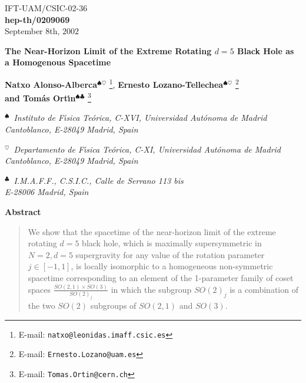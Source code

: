 \documentclass[12pt,a4paper]{article}
\begin{document}
\begin{flushright}
\small
IFT-UAM/CSIC-02-36\\
{\bf hep-th/0209069}\\
September $8$th, $2002$
\normalsize
\end{flushright}

\begin{center}


\vspace{2cm}

{\Large {\bf The Near-Horizon Limit of the Extreme Rotating $d=5$
    Black Hole as a Homogenous Spacetime}}

\vspace{2cm}

{\bf\large Natxo Alonso-Alberca}${}^{\spadesuit\heartsuit}$
\footnote{E-mail: {\tt natxo@leonidas.imaff.csic.es}},
{\bf\large Ernesto Lozano-Tellechea}${}^{\spadesuit\heartsuit}$
\footnote{E-mail: {\tt Ernesto.Lozano@uam.es}}\\
{\bf\large and Tom{\'a}s Ort\'{\i}n}${}^{\spadesuit\clubsuit}$
\footnote{E-mail: {\tt Tomas.Ortin@cern.ch}}

\vspace{1cm}

${}^{\spadesuit}$\ {\it Instituto de F\'{\i}sica Te{\'o}rica, C-XVI,
Universidad Aut{\'o}noma de Madrid\\
Cantoblanco, E-28049 Madrid, Spain}

\vskip 0.2cm
${}^{\heartsuit}$\ {\it Departamento de F\'{\i}sica Te{\'o}rica, C-XI,
Universidad Aut{\'o}noma de Madrid\\
Cantoblanco, E-28049 Madrid, Spain}

\vskip 0.2cm
${}^{\clubsuit}$\ {\it I.M.A.F.F., C.S.I.C., 
Calle de Serrano 113 bis\\ 
E-28006 Madrid, Spain}
\vspace{.7cm}






{\bf Abstract}

\end{center}

\begin{quotation}

\small

We show that the spacetime of the near-horizon limit of the extreme
rotating $d=5$ black hole, which is maximally supersymmetric in
$N=2,d=5$ supergravity for any value of the rotation parameter $j\in
[-1,1]$, is locally isomorphic to a homogeneous non-symmetric
spacetime corresponding to an element of the 1-parameter family of
coset spaces $\frac{SO(2,1)\times SO(3)}{SO(2)_{j}}$ in which the
subgroup $SO(2)_{j}$ is a combination of the two $SO(2)$ subgroups of
$SO(2,1)$ and $SO(3)$.

\end{quotation}
\end{document}
